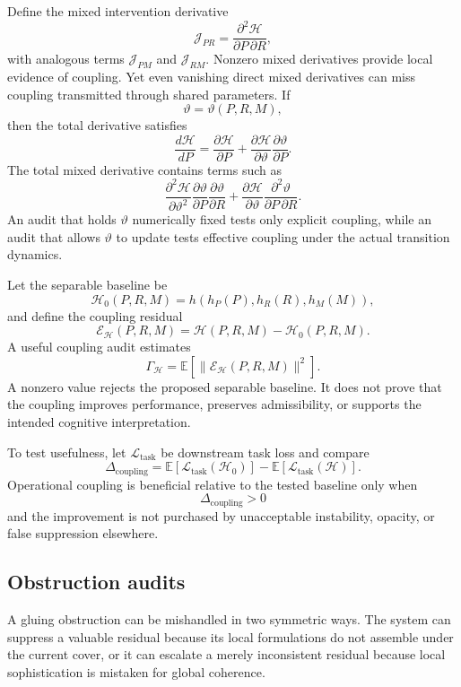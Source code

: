 \documentclass[11pt]{article}
\theoremstyle{definition}
\newcommand{\E}{\mathbb{E}}
\begin{document}
Define the mixed intervention derivative
\[
\mathcal{J}_{PR}
=
\frac{\partial^2\mathcal{H}}{\partial P\,\partial R},
\]
with analogous terms \(\mathcal{J}_{PM}\) and \(\mathcal{J}_{RM}\). Nonzero mixed derivatives provide local evidence of coupling. Yet even vanishing direct mixed derivatives can miss coupling transmitted through shared parameters. If
\[
\vartheta=\vartheta(P,R,M),
\]
then the total derivative satisfies
\[
\frac{d\mathcal{H}}{dP}
=
\frac{\partial\mathcal{H}}{\partial P}
+
\frac{\partial\mathcal{H}}{\partial\vartheta}
\frac{\partial\vartheta}{\partial P}.
\]
The total mixed derivative contains terms such as
\[
\frac{\partial^2\mathcal{H}}
{\partial\vartheta^2}
\frac{\partial\vartheta}{\partial P}
\frac{\partial\vartheta}{\partial R}
+
\frac{\partial\mathcal{H}}{\partial\vartheta}
\frac{\partial^2\vartheta}{\partial P\,\partial R}.
\]
An audit that holds \(\vartheta\) numerically fixed tests only explicit coupling, while an audit that allows \(\vartheta\) to update tests effective coupling under the actual transition dynamics.

Let the separable baseline be
\[
\mathcal{H}_{0}(P,R,M)
=
h\!\left(
h_P(P),h_R(R),h_M(M)
\right),
\]
and define the coupling residual
\[
\mathcal{E}_{\mathcal{H}}(P,R,M)
=
\mathcal{H}(P,R,M)-\mathcal{H}_{0}(P,R,M).
\]
A useful coupling audit estimates
\[
\Gamma_{\mathcal{H}}
=
\E\!\left[
\lVert
\mathcal{E}_{\mathcal{H}}(P,R,M)
\rVert^2
\right].
\]
A nonzero value rejects the proposed separable baseline. It does not prove that the coupling improves performance, preserves admissibility, or supports the intended cognitive interpretation.

To test usefulness, let \(\mathcal{L}_{\mathrm{task}}\) be downstream task loss and compare
\[
\Delta_{\mathrm{coupling}}
=
\E[
\mathcal{L}_{\mathrm{task}}(\mathcal{H}_0)
]
-
\E[
\mathcal{L}_{\mathrm{task}}(\mathcal{H})
].
\]
Operational coupling is beneficial relative to the tested baseline only when
\[
\Delta_{\mathrm{coupling}}>0
\]
and the improvement is not purchased by unacceptable instability, opacity, or false suppression elsewhere.

\subsection{Obstruction audits}

A gluing obstruction can be mishandled in two symmetric ways. The system can suppress a valuable residual because its local formulations do not assemble under the current cover, or it can escalate a merely inconsistent residual because local sophistication is mistaken for global coherence.
\end{document}
